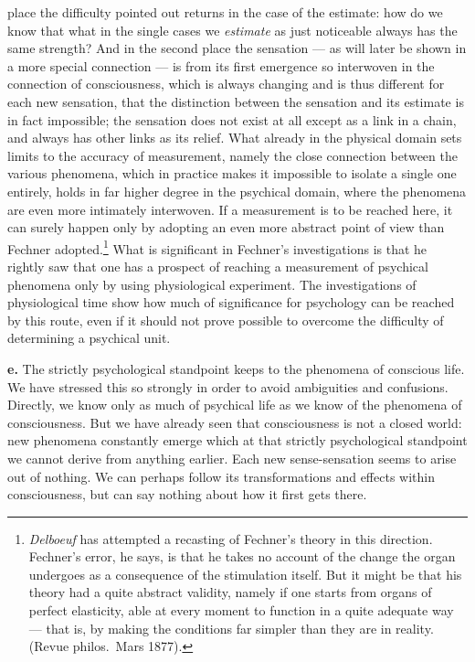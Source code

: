 \documentclass[12pt,a4paper]{book}
\newcommand{\opage}[1]{\marginnote{\footnotesize\textit{[#1]}}}
\begin{document}
place the difficulty pointed out returns in the case of the estimate:
how do we know that what in the single cases we \emph{estimate} as just
noticeable always has the same strength? And in the second place the
sensation --- as will later be shown in a more special connection --- is
from its first emergence so interwoven in the connection of
consciousness, which is always changing and is thus different for each
new sensation, that the distinction between the sensation and its
estimate is in fact impossible; the sensation does not exist at all
except as a link in a chain, and always has other links as its relief.
What already in the physical domain sets limits to the accuracy of
measurement,
\opage{28}namely the close connection between the various phenomena,
which in practice makes it impossible to isolate a single one entirely,
holds in far higher degree in the psychical domain, where the phenomena
are even more intimately interwoven. If a measurement is to be reached
here, it can surely happen only by adopting an even more abstract point
of view than Fechner adopted.\footnote{\emph{Delboeuf} has attempted a
recasting of Fechner's theory in this direction. Fechner's error, he
says, is that he takes no account of the change the organ undergoes as a
consequence of the stimulation itself. But it might be that his theory
had a quite abstract validity, namely if one starts from organs of
perfect elasticity, able at every moment to function in a quite adequate
way --- that is, by making the conditions far simpler than they are in
reality. (Revue philos.\ Mars 1877).} What is significant in Fechner's
investigations is that he rightly saw that one has a prospect of reaching
a measurement of psychical phenomena only by using physiological
experiment. The investigations of physiological time show how much of
significance for psychology can be reached by this route, even if it
should not prove possible to overcome the difficulty of determining a
psychical unit.

\textbf{e.} The strictly psychological standpoint keeps to the phenomena
of conscious life. We have stressed this so strongly in order to avoid
ambiguities and confusions. Directly, we know only as much of psychical
life as we know of the phenomena of consciousness. But we have already
seen that consciousness is not a closed world: new phenomena constantly
emerge which at that strictly psychological standpoint we cannot derive
from anything earlier. Each new sense-sensation seems to arise out of
nothing. We can perhaps follow its transformations and effects within
consciousness, but can say nothing about how it first gets there.
\end{document}
